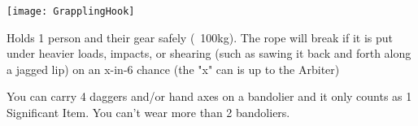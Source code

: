{  



    \begin{center}
  \texttt{[image: GrapplingHook]}
  \end{center}

\newpage



\begin{multicols}{2}


   Holds 1 person and their gear safely (~100kg). The rope will break if it is put under heavier loads, impacts, or shearing (such as sawing it back and forth along a jagged lip) on an x-in-6 chance (the "x" can is up to the Arbiter)
  
   You can carry 4 daggers and/or hand axes on a bandolier and it only counts as 1 Significant Item. You can't wear more than 2 bandoliers.
  

\end{multicols}}
